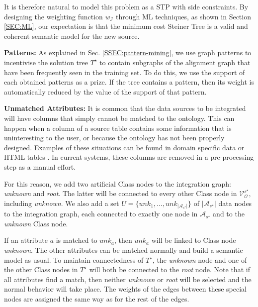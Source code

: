 \documentclass[letterpaper]{article} %
\newcommand{\authornote}[3]{
  {\fbox{\sc 
  #1}:$\blacktriangleright$\textcolor{#2}{\small{#3}}$\blacktriangleleft$}%
}
\newcommand{\ddg}[1]{\authornote{DDG}{blue}{#1}}
\newcommand{\forijcai}[1]{}
\begin{document}
It is therefore natural to model this problem as a STP with side constraints.
By designing the weighting function $w_\mathcal{I}$ through 
ML techniques, as shown in Section \ref{SEC:ML}, 
our expectation is that the minimum cost Steiner Tree is a valid and coherent semantic model for the new source.

\textbf{Patterns:}
As explained in Sec. \ref{SSEC:pattern-mining}, we use 
graph patterns to incentivise the solution tree 
$T^\star$ to contain subgraphs of the alignment graph that have been frequently 
seen in the training set.
To do this, we use the support of each obtained patterns as a prize. If 
the tree contains a pattern, then its weight is automatically reduced by the 
value of the support of that pattern. \forijcai{Sec. \ref{SEC:rel2ontocp} shows how this is integrated in the model.}

\textbf{Unmatched Attributes:}
It is common that the data sources to be integrated will have columns that 
simply cannot be matched to the ontology.
This can happen when a column of a source table contains some information that 
is uninteresting to the user, or because the ontology has not been properly 
designed. 
Examples of these situations can be found in domain specific data 
\cite{Pham:semantic} or HTML tables \cite{Ritze:matching}.
In current systems, these columns are removed in a pre-processing step as a manual effort.

For this reason, we add two artificial Class nodes to the integration graph:  
\emph{unknown} and \emph{root}. 
The latter will be connected to every other Class node in 
$\mathcal{V}_\mathcal{O}^{s^\star}$, including \emph{unknown}.
We also add a set $U = \{unk_1,...,unk_{|\mathcal{A}_{s^\star}|}\}$ of 
$|\mathcal{A}_{s^\star}|$ data 
nodes to the integration graph, each connected to exactly one node in 
$\mathcal{A}_{s^\star}$ and to the \emph{unknown} Class node.  

If an attribute $a$ is matched to $unk_a$, then $unk_a$ will be linked to Class 
node \emph{unknown}. 
The other attributes can be matched normally 
and build a semantic model as usual. 
To maintain connectedness of $T^\star$, the \emph{unknown} node and one of the other Class nodes in $T^\star$ 
will 
both be connected to the \emph{root} node. 
Note that if all attributes find a 
match, then neither \emph{unknown} or \emph{root} will be selected and the normal behavior will take place.
The weights of the edges between these special nodes are
assigned the same way as for the rest of the edges.
\end{document}
